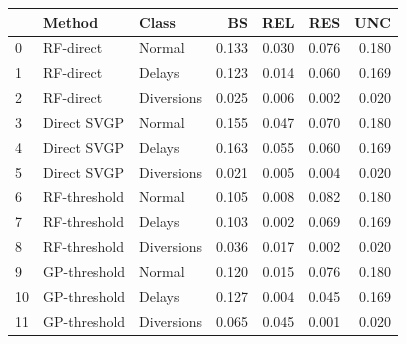 \begin{tabular}{lllrrrr}
\toprule
 & Method & Class & BS & REL & RES & UNC \\
\midrule
0 & RF-direct & Normal & 0.133 & 0.030 & 0.076 & 0.180 \\
1 & RF-direct & Delays & 0.123 & 0.014 & 0.060 & 0.169 \\
2 & RF-direct & Diversions & 0.025 & 0.006 & 0.002 & 0.020 \\
3 & Direct SVGP & Normal & 0.155 & 0.047 & 0.070 & 0.180 \\
4 & Direct SVGP & Delays & 0.163 & 0.055 & 0.060 & 0.169 \\
5 & Direct SVGP & Diversions & 0.021 & 0.005 & 0.004 & 0.020 \\
6 & RF-threshold & Normal & 0.105 & 0.008 & 0.082 & 0.180 \\
7 & RF-threshold & Delays & 0.103 & 0.002 & 0.069 & 0.169 \\
8 & RF-threshold & Diversions & 0.036 & 0.017 & 0.002 & 0.020 \\
9 & GP-threshold & Normal & 0.120 & 0.015 & 0.076 & 0.180 \\
10 & GP-threshold & Delays & 0.127 & 0.004 & 0.045 & 0.169 \\
11 & GP-threshold & Diversions & 0.065 & 0.045 & 0.001 & 0.020 \\
\bottomrule
\end{tabular}
